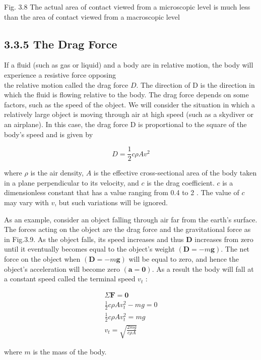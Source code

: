 \documentclass[10pt]{article}
\begin{document}
Fig. 3.8 The actual area of contact viewed from a microscopic level is much less than the area of contact viewed from a macroscopic level

\subsection*{3.3.5 The Drag Force}
If a fluid (such as gas or liquid) and a body are in relative motion, the body will experience a resistive force opposing\\
the relative motion called the drag force $D$. The direction of D is the direction in which the fluid is flowing relative to the body. The drag force depends on some factors, such as the speed of the object. We will consider the situation in which a relatively large object is moving through air at high speed (such as a skydiver or an airplane). In this case, the drag force D is proportional to the square of the body's speed and is given by

$$
D=\frac{1}{2} c \rho A v^{2}
$$

where $\rho$ is the air density, $A$ is the effective cross-sectional area of the body taken in a plane perpendicular to its velocity, and $c$ is the drag coefficient. $c$ is a dimensionless constant that has a value ranging from 0.4 to 2 . The value of $c$ may vary with $v$, but such variations will be ignored.

As an example, consider an object falling through air far from the earth's surface. The forces acting on the object are the drag force and the gravitational force as in Fig.3.9. As the object falls, its speed increases and thus $\mathbf{D}$ increases from zero until it eventually becomes equal to the object's weight $(\mathbf{D}=-m \mathbf{g})$. The net force on the object when $(\mathbf{D}=-m \mathbf{g})$ will be equal to zero, and hence the object's acceleration will become zero $(\mathbf{a}=\mathbf{0})$. As a result the body will fall at a constant speed called the terminal speed $v_{t}$ :

$$
\begin{gathered}
\Sigma \mathbf{F}=\mathbf{0} \\
\frac{1}{2} c \rho A v_{t}^{2}-m g=0 \\
\frac{1}{2} c \rho A v_{t}^{2}=m g \\
v_{t}=\sqrt{\frac{2 m g}{c \rho A}}
\end{gathered}
$$

where $m$ is the mass of the body.
\end{document}
